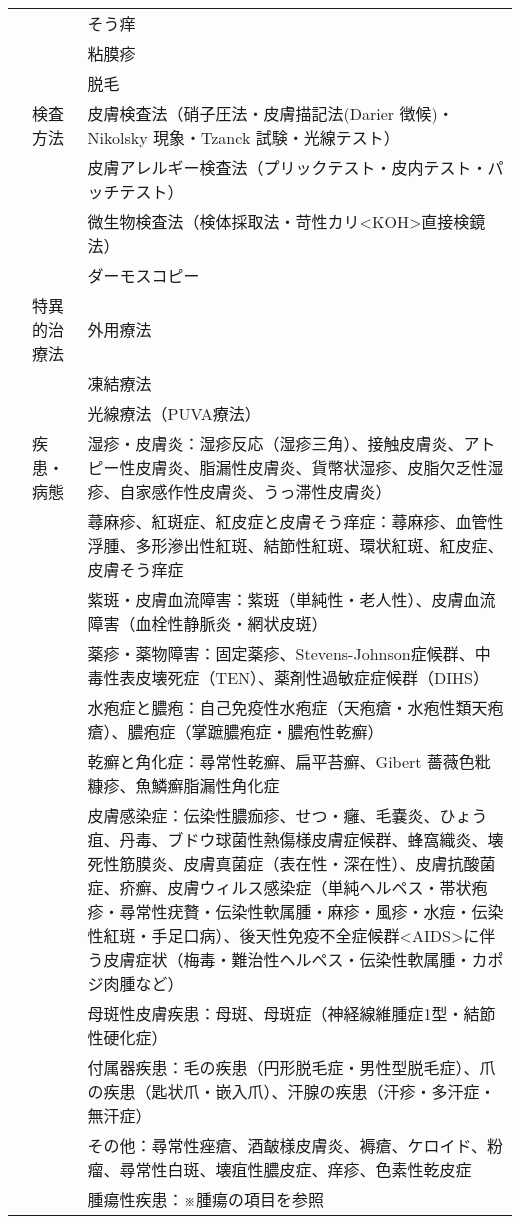\documentclass[
]{ltjsarticle}
\begin{document}
\begin{xltabular}{\linewidth}{XXX}
 &  & そう痒 \\
 &  & 粘膜疹 \\
 &  & 脱毛 \\
 & 検査方法 & 皮膚検査法（硝子圧法・皮膚描記法(Darier 徴候)・Nikolsky 現象・Tzanck 試験・光線テスト） \\
 &  & 皮膚アレルギー検査法（プリックテスト・皮内テスト・パッチテスト） \\
 &  & 微生物検査法（検体採取法・苛性カリ<KOH>直接検鏡法） \\
 &  & ダーモスコピー \\
 & 特異的治療法 & 外用療法 \\
 &  & 凍結療法 \\
 &  & 光線療法（PUVA療法） \\
 & 疾患・病態 & 湿疹・皮膚炎：湿疹反応（湿疹三角）、接触皮膚炎、アトピー性皮膚炎、脂漏性皮膚炎、貨幣状湿疹、皮脂欠乏性湿疹、自家感作性皮膚炎、うっ滞性皮膚炎） \\
 &  & 蕁麻疹、紅斑症、紅皮症と皮膚そう痒症：蕁麻疹、血管性浮腫、多形滲出性紅斑、結節性紅斑、環状紅斑、紅皮症、皮膚そう痒症 \\
 &  & 紫斑・皮膚血流障害：紫斑（単純性・老人性）、皮膚血流障害（血栓性静脈炎・網状皮斑） \\
 &  & 薬疹・薬物障害：固定薬疹、Stevens-Johnson症候群、中毒性表皮壊死症（TEN）、薬剤性過敏症症候群（DIHS） \\
 &  & 水疱症と膿疱：自己免疫性水疱症（天疱瘡・水疱性類天疱瘡）、膿疱症（掌蹠膿疱症・膿疱性乾癬） \\
 &  & 乾癬と角化症：尋常性乾癬、扁平苔癬、Gibert 薔薇色粃糠疹、魚鱗癬脂漏性角化症 \\
 &  & 皮膚感染症：伝染性膿痂疹、せつ・癰、毛嚢炎、ひょう疽、丹毒、ブドウ球菌性熱傷様皮膚症候群、蜂窩織炎、壊死性筋膜炎、皮膚真菌症（表在性・深在性）、皮膚抗酸菌症、疥癬、皮膚ウィルス感染症（単純ヘルペス・帯状疱疹・尋常性疣贅・伝染性軟属腫・麻疹・風疹・水痘・伝染性紅斑・手足口病）、後天性免疫不全症候群<AIDS>に伴う皮膚症状（梅毒・難治性ヘルペス・伝染性軟属腫・カポジ肉腫など） \\
 &  & 母斑性皮膚疾患：母斑、母斑症（神経線維腫症1型・結節性硬化症） \\
 &  & 付属器疾患：毛の疾患（円形脱毛症・男性型脱毛症）、爪の疾患（匙状爪・嵌入爪）、汗腺の疾患（汗疹・多汗症・無汗症） \\
 &  & その他：尋常性痤瘡、酒皶様皮膚炎、褥瘡、ケロイド、粉瘤、尋常性白斑、壊疽性膿皮症、痒疹、色素性乾皮症 \\
 &  & 腫瘍性疾患：※腫瘍の項目を参照 \\

\end{xltabular}
\end{document}
